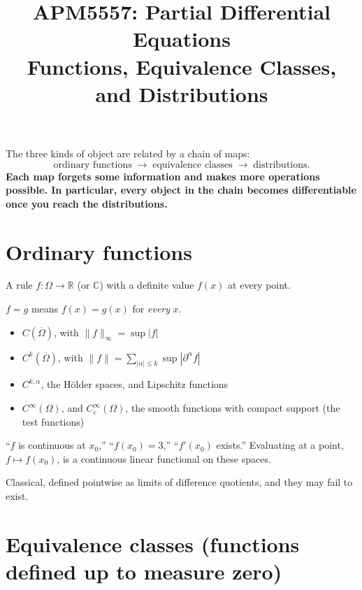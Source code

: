 \documentclass[11pt]{article}
\title{APM5557: Partial Differential Equations\\Functions, Equivalence Classes, and Distributions}
\author{}
\date{}
\newcommand{\R}{\mathbb{R}}
\newcommand{\C}{\mathbb{C}}
\newcommand{\Cc}{C_c^\infty}
\begin{document}
\maketitle

The three kinds of object are related by a chain of maps:
\[
  \text{ordinary functions} \;\longrightarrow\; \text{equivalence classes}
  \;\longrightarrow\; \text{distributions}.
\]
\textbf{Each map forgets some information and makes more operations possible.
In particular, every object in the chain becomes differentiable once you reach
the distributions.}

\section{Ordinary functions}

\begin{description}[leftmargin=0pt]
  \item[What they are.] A rule $f:\Omega\to\R$ (or $\C$) with a definite value
    $f(x)$ at every point.
  \item[Equality.] $f=g$ means $f(x)=g(x)$ for \emph{every} $x$.
  \item[Typical spaces.] \leavevmode
    \begin{itemize}
      \item $C(\overline\Omega)$, with $\|f\|_\infty=\sup|f|$
      \item $C^k(\overline\Omega)$, with
        $\|f\| = \sum_{|\alpha|\le k}\sup|\partial^\alpha f|$
      \item $C^{k,\alpha}$, the H\"older spaces, and Lipschitz functions
      \item $C^\infty(\Omega)$, and $\Cc(\Omega)$, the smooth functions with
        compact support (the test functions)
    \end{itemize}
  \item[Language.] ``$f$ is continuous at $x_0$,'' ``$f(x_0)=3$,'' ``$f'(x_0)$
    exists.'' Evaluating at a point, $f\mapsto f(x_0)$, is a continuous linear
    functional on these spaces.
  \item[Derivatives.] Classical, defined pointwise as limits of difference
    quotients, and they may fail to exist.
\end{description}

\section{Equivalence classes (functions defined up to measure zero)}
\end{document}
